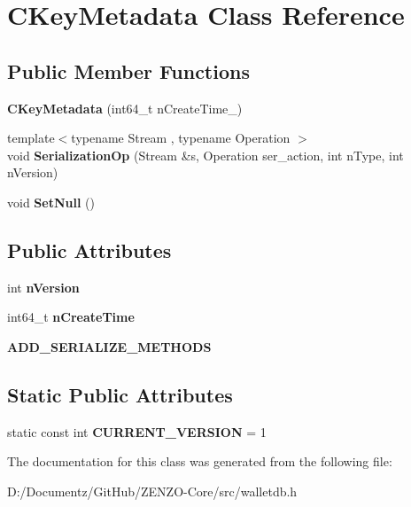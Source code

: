 \hypertarget{class_c_key_metadata}{}\section{C\+Key\+Metadata Class Reference}
\label{class_c_key_metadata}
\subsection*{Public Member Functions}
\begin{DoxyCompactItemize}
\item 
\mbox{\label{class_c_key_metadata_accabc99065b0dbdd8862b4338266893f}} 
{\bfseries C\+Key\+Metadata} (int64\+\_\+t n\+Create\+Time\+\_\+)
\item 
\mbox{\label{class_c_key_metadata_aeba08a154d4b3f6ddac96c25b852d342}} 
{\footnotesize template$<$typename Stream , typename Operation $>$ }\\void {\bfseries Serialization\+Op} (Stream \&s, Operation ser\+\_\+action, int n\+Type, int n\+Version)
\item 
\mbox{\label{class_c_key_metadata_ab78641eb092af623a363b5c403c06a1f}} 
void {\bfseries Set\+Null} ()
\end{DoxyCompactItemize}
\subsection*{Public Attributes}
\begin{DoxyCompactItemize}
\item 
\mbox{\label{class_c_key_metadata_a52f63ceb60b53e491666b6aa59a4d818}} 
int {\bfseries n\+Version}
\item 
\mbox{\label{class_c_key_metadata_accfd31222aefcbdcba1fb0214e546e6d}} 
int64\+\_\+t {\bfseries n\+Create\+Time}
\item 
\mbox{\label{class_c_key_metadata_a7e1f57544d6d63342bddeee5a08aba1a}} 
{\bfseries A\+D\+D\+\_\+\+S\+E\+R\+I\+A\+L\+I\+Z\+E\+\_\+\+M\+E\+T\+H\+O\+DS}
\end{DoxyCompactItemize}
\subsection*{Static Public Attributes}
\begin{DoxyCompactItemize}
\item 
\mbox{\label{class_c_key_metadata_a805f9472960eec81031596ce1133e629}} 
static const int {\bfseries C\+U\+R\+R\+E\+N\+T\+\_\+\+V\+E\+R\+S\+I\+ON} = 1
\end{DoxyCompactItemize}


The documentation for this class was generated from the following file\+:\begin{DoxyCompactItemize}
\item 
D\+:/\+Documentz/\+Git\+Hub/\+Z\+E\+N\+Z\+O-\/\+Core/src/walletdb.\+h\end{DoxyCompactItemize}
